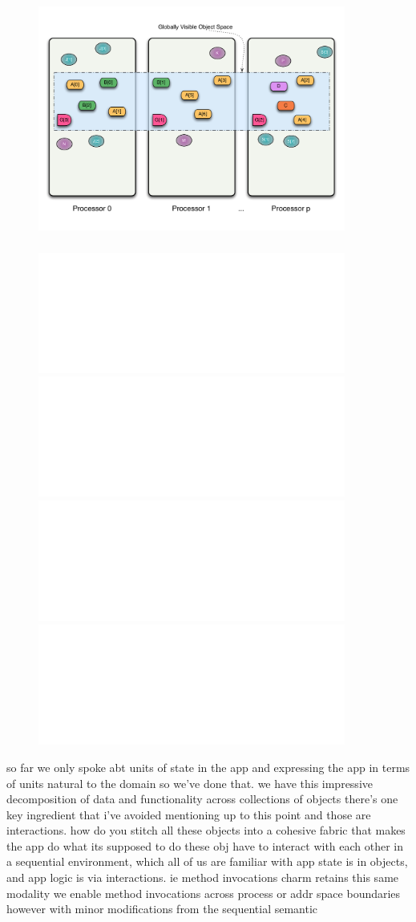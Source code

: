 \begin{frame}
  \frametitle{
  }
  \begin{figure}\includegraphics[width=0.9\textwidth]{../figures/progmodel/07-obj-programmer-view.pdf}\end{figure}
\end{frame}


\begin{frame}
  \frametitle{}
  \begin{figure}
	\includegraphics<1>[width=0.9\textwidth]{../figures/progmodel/07-obj-programmer-view.pdf}
	\includegraphics<2>[width=0.9\textwidth]{../figures/progmodel/05-parallelism-via-obj-collections.pdf}
	\includegraphics<3>[width=0.9\textwidth]{../figures/progmodel/08-seq-obj-methods.pdf}
	\includegraphics<4>[width=0.9\textwidth]{../figures/progmodel/09-rmi-synchronous.pdf}
  \end{figure}
so far we only spoke abt units of state in the app
and expressing the app in terms of units natural to the domain
so we've done that.
we have this impressive decomposition of data and functionality across collections of objects
there's one key ingredient that i've avoided mentioning up to this point
and those are interactions.
how do you stitch all these objects into a cohesive fabric that makes the app do what its supposed
to do
these obj have to interact with each other
% 
in a sequential environment, which all of us are familiar with
app state is in objects, and app logic is via interactions. ie method invocations
%
charm retains this same modality
we enable method invocations across process or addr space boundaries
%
however with minor modifications from the sequential semantic
\end{frame}


